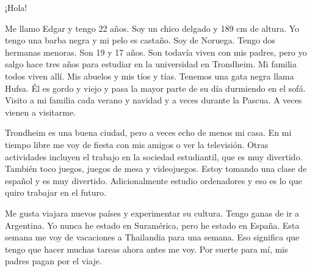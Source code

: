 ¡Hola!

Me llamo Edgar y tengo 22 años. Soy un chico delgado y 189 cm de altura. Yo tengo una barba negra y mi pelo es castaño. Soy de Noruega. Tengo dos hermanas menoras. Son 19 y 17 años. Son todavía viven con mis padres, pero yo salgo hace tres años para estudiar en la universidad en Trondheim. Mi familia todos viven allí. Mis abuelos y mis tíos y tías. Tenemos una gata negra llama Hufsa. Él es gordo y viejo y pasa la mayor parte de su día durmiendo en el sofá. Visito a mi familia cada verano y navidad y a veces durante la Pascua. A veces vienen a visitarme.

Trondheim es una buena ciudad, pero a veces echo de menos mi casa. En mi tiempo libre me voy de fiesta con mis amigos o ver la televisión. Otras actividades incluyen el trabajo en la sociedad estudiantil, que es muy divertido. También toco juegos, juegos de mesa y videojuegos. Estoy tomando una clase de español y es muy divertido. Adicionalmente estudio ordenadores y eso es lo que quiro trabajar en el futuro. 

Me gusta viajara nuevos países y experimentar su cultura. Tengo ganas de ir a Argentina. Yo nunca he estado en Suramérica, pero he estado en España. Esta semana me voy de vacaciones a Thailandia para una semana. Eso significa que tengo que hacer muchas tareas ahora antes me voy. Por suerte para mí, mis padres pagan por el viaje. 
